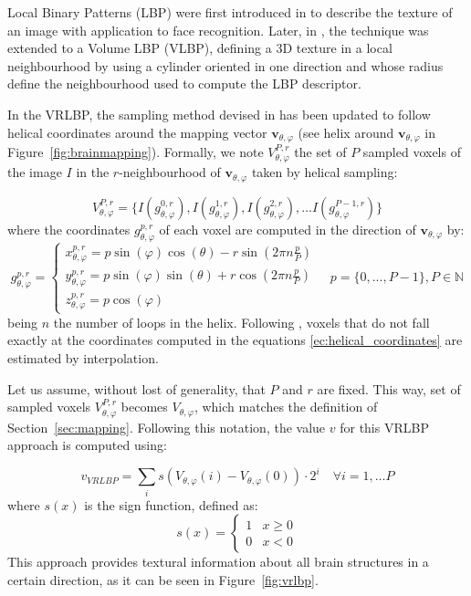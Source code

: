 Local Binary Patterns (LBP) were first introduced in \cite{Ojala1996} to describe the texture of an image with application to face recognition. Later, in \cite{Zhao2007}, the technique was extended to a Volume LBP (VLBP), defining a 3D texture in a local neighbourhood by using a cylinder oriented in one direction and whose radius define the neighbourhood used to compute the LBP descriptor. 

In the VRLBP, the sampling method devised in \cite{Zhao2007} has been updated to follow helical coordinates around the mapping vector $\mathbf{v}_{\theta,\varphi}$ (see helix around $\mathbf{v}_{\theta,\varphi}$ in Figure~\ref{fig:brainmapping}). Formally, we note $V_{\theta,\varphi}^{P,r}$ the set of $P$ sampled voxels of the image $I$ in the $r$-neighbourhood of $\mathbf{v}_{\theta,\varphi}$ taken by helical sampling:

\begin{equation}
V_{\theta,\varphi}^{P,r}=\lbrace I(g_{\theta,\varphi}^{0,r}), I(g_{\theta,\varphi}^{1,r}), I(g_{\theta,\varphi}^{2,r}), \dots I(g_{\theta,\varphi}^{P-1,r})\rbrace
\end{equation} 
where the coordinates $g_{\theta,\varphi}^{p,r}$ of each voxel are computed in the direction of $\mathbf{v}_{\theta,\varphi}$ by: 
\begin{equation}
\label{ec:helical_coordinates}
g_{\theta,\varphi}^{p,r}=\begin{cases}
x_{\theta,\varphi}^{p,r}=p\sin(\varphi)\cos(\theta)-r\sin(2\pi n\frac{p}{P})\\
y_{\theta,\varphi}^{p,r}=p\sin(\varphi)\sin(\theta)+r\cos(2\pi n\frac{p}{P})\\
z_{\theta,\varphi}^{p,r}=p\cos(\varphi) 
\end{cases} \quad p=\{0,...,P-1\}, P \in \mathbb{N}
\end{equation}
being $n$ the number of loops in the helix. Following \cite{Zhao2007}, voxels that do not fall exactly at the coordinates computed in the equations \ref{ec:helical_coordinates} are estimated by interpolation.

Let us assume, without lost of generality, that $P$ and $r$ are fixed. This way, set of sampled voxels $V_{\theta,\varphi}^{P,r}$ becomes $V_{\theta,\varphi}$, which matches the definition of Section~\ref{sec:mapping}. Following this notation, the value $v$ for this VRLBP approach is computed using: 

\begin{equation}
v_{VRLBP} = \sum_{i} s(V_{\theta,\varphi}(i)-V_{\theta,\varphi}(0))\cdot 2^{i} \quad \forall i=1,\dots P
\end{equation}
where $s(x)$ is the sign function, defined as: 
\begin{equation} %
s(x) = 
\begin{cases}
1      &  x \geq 0 \\
0      &  x < 0
\end{cases}
\end{equation}
This approach provides textural information about all brain structures in a certain direction, as it can be seen in Figure~\ref{fig:vrlbp}. 


